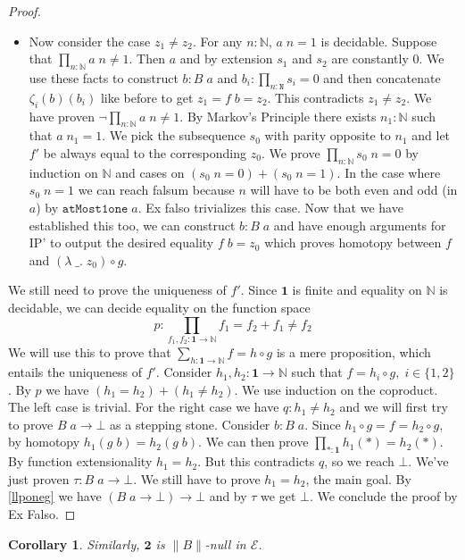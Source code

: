 \documentclass[12pt]{report}
\newtheorem{cor}[thm]{Corollary}
\begin{document}
\begin{proof}
\begin{itemize}
\item Now consider the case $z_1 \neq z_2$. 
For any $n : \mathbb{N}$, $a\; n = 1$ is decidable. 
Suppose that $\prod_{n : 
\mathbb{N}} a\; n \neq 1$. 
Then $a$ and by extension $s_1$ and $s_2$ are constantly $0$. 
We use these facts to construct $b : B\;a$ and $b_i : \prod_{n : \mathtt{N}}s_i = 0$ and then concatenate $\zeta_i(b)(b_i)$ like before to get $z_1 = f\; b = z_2$. 
This contradicts $z_1 \neq z_2$. 
We have proven $\neg \prod_{n : 
\mathbb{N}} a\; n \neq 1$. 
By Markov's Principle there exists $n_1 : \mathbb{N}$ such that $a\; n_1 = 1$. 
We pick the subsequence $s_0$ with parity opposite to $n_1$ and let $f'$ be always equal to the corresponding $z_0$. 
We prove $\prod_{n : \mathbb{N}} s_0\; n = 0$ by induction on $\mathbb{N}$ and cases on $(s_0 \;n = 0) + (s_0\;n = 1)$. 
In the case where $s_0\; n = 1$ we can reach falsum because $n$ will have to be both even and odd (in $a$) by $\mathtt{atMost1one} \; a$. Ex falso trivializes this case. 
Now that we have established this too, we can construct $b : B\; a$ and have enough arguments for IP' to output the desired equality $f\; b = z_0$ which proves homotopy between $f$ and $(\lambda\;\_.\; z_0) \circ g$.
\end{itemize}
We still need to prove the uniqueness of $f'$. 
Since $\mathbf{1}$ is finite and equality on $\mathbb{N}$ is decidable, we can decide equality on the function space 
$$p : \prod_{f_1,f_2 : \mathbf{1}\rightarrow \mathbb{N}} f_1 = f_2 + f_1 \neq f_2$$
We will use this to prove that $\sum_{h : \mathbf{1}\rightarrow \mathbb{N}} f= h \circ g$ is a mere proposition, which entails the uniqueness of $f'$. 
Consider $h_1,h_2 : \mathbf{1}\rightarrow \mathbb{N}$ such that $f= h_i \circ g,\; i \in \{1,2\}$. 
By $p$ we have $(h_1 = h_2) + (h_1 \neq h_2)$. 
We use induction on the coproduct. 
The left case is trivial. 
For the right case we have $q : h_1 \neq h_2$ and we will first try to prove $B\; a \rightarrow \bot$ as a stepping stone. 
Consider $b : B\; a$. 
Since $h_1 \circ g = f = h_2 \circ g$, by homotopy $h_1 (g\; b) = h_2 (g\; b)$. 
We can then prove $\prod_{*: \mathbf{1}} h_1 (*) = h_2 (*)$. 
By function extensionality $h_1 = h_2$. 
But this contradicts $q$, so we reach $\bot$. 
We've just proven $\tau : B\;a \rightarrow \bot$. 
We still have to prove $h_1 = h_2$, the main goal. 
By \cref{llponeg} we have $(B\; a \rightarrow \bot) \rightarrow \bot$ and by $\tau$ we get $\bot$. 
We conclude the proof by Ex Falso.
\end{proof}

\begin{cor}
Similarly, $\mathbf{2}$ is $\lVert B \rVert$-null in $\mathcal{E}$. 
\end{cor}
\end{document}

